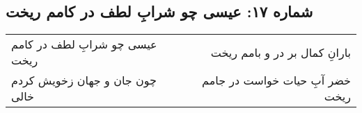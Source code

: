 \begin{center}
\section*{شماره ۱۷: عیسی چو شرابِ لطف در کامم ریخت}
\label{sec:017}
\begin{longtable}{l p{0.5cm} r}
عیسی چو شرابِ لطف در کامم ریخت
&&
بارانِ کمال بر در و بامم ریخت
\\
چون جان و جهان زخویش کردم خالی
&&
خضر آبِ حیات خواست در جامم ریخت
\\
\end{longtable}
\end{center}

